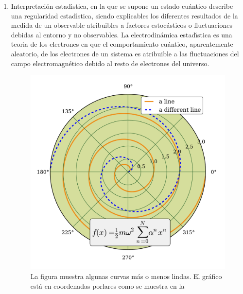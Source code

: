 \begin{enumerate}
\item Interpretaci\'{o}n estad\'{\i}stica, en la que se supone un estado cu\'{a}ntico describe una
  regularidad estad\'{\i}stica, siendo explicables los diferentes resultados de la medida de un
  observable atribuibles a factores estoc\'{a}sticos o fluctuaciones debidas al entorno y no
  observables. La electrodin\'{a}mica estad\'{\i}stica es una teor\'{\i}a de los electrones en que el
  comportamiento cu\'{a}ntico, aparentemente aleatorio, de los electrones de un sistema es
  atribuible a las fluctuaciones del campo electromagn\'{e}tico debido al resto de electrones
  del universo.
\begin{figure}[ht]
\centering\includegraphics[width=\imsize]{cap2_f1}
\caption[La figura muestra algunas curvas m\'{a}s o menos lindas]{La figura muestra algunas curvas m\'{a}s o menos lindas. El gr\'{a}fico est\'{a} en coordenadas porlares como se muestra en la }
\end{figure}



\end{enumerate}
